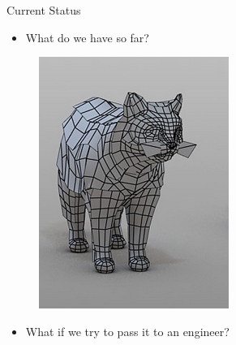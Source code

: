 \newcommand{\norm}[1]{\parallel #1 \parallel_2}

\begin{frame}{Current Status}
\begin{minipage}[t]{0.4\linewidth}

\begin{itemize}
\item What do we have so far?
\end{itemize}
\vspace{5mm}
\begin{figure}
\includegraphics[width=0.8\linewidth]{Pictures/cat.png}
\end{figure}
\end{minipage}%
\pause
\begin{minipage}[t]{0.6\linewidth}
\begin{itemize}
\item What if we try to pass it to an engineer?
\end{itemize}
\begin{figure}

\end{figure}
\end{minipage}
\end{frame}

